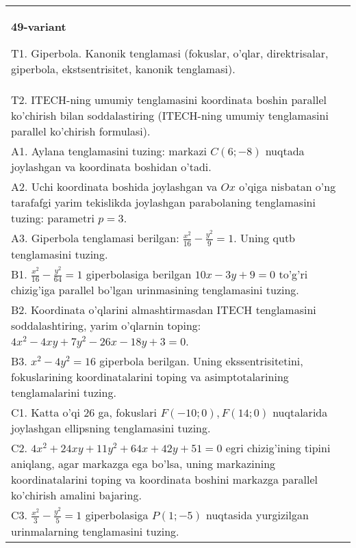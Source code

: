 \documentclass{article}
\begin{document}
\begin{tabular}{m{17cm}}
\textbf{49-variant}
\newline

T1. Giperbola. Kanonik tenglamasi (fokuslar, o'qlar, direktrisalar, giperbola, ekstsentrisitet, kanonik tenglamasi).\\

T2. ITECH-ning umumiy tenglamasini koordinata boshin parallel ko'chirish bilan soddalastiring (ITECH-ning umumiy tenglamasini parallel ko'chirish formulasi).\\

A1. Aylana tenglamasini tuzing: markazi $C(6;-8)$ nuqtada joylashgan va koordinata boshidan o'tadi.\\

A2. Uchi koordinata boshida joylashgan va $Ox$ o'qiga nisbatan o'ng tarafafgi yarim tekislikda joylashgan parabolaning tenglamasini tuzing: parametri $p=3$.\\

A3. Giperbola tenglamasi berilgan: $\frac{x^{2}}{16}-\frac{y^{2}}{9}=1$. Uning qutb tenglamasini tuzing.\\

B1. $\frac{x^{2}}{16} - \frac{y^{2}}{64} = 1$ giperbolasiga berilgan $10x - 3y + 9 = 0$ to'g'ri chizig'iga parallel bo'lgan urinmasining tenglamasini tuzing.  \\

B2. Koordinata o'qlarini almashtirmasdan ITECH tenglamasini soddalashtiring, yarim o'qlarnin toping: $4x^{2} - 4xy + 7y^{2} - 26x - 18y + 3 = 0$.\\

B3. $x^{2} - 4y^{2} = 16$ giperbola berilgan. Uning ekssentrisitetini, fokuslarining koordinatalarini toping va asimptotalarining tenglamalarini tuzing.\\

C1. Katta o'qi 26 ga, fokuslari $F( - 10;0), F(14;0)$ nuqtalarida joylashgan ellipsning tenglamasini tuzing.  \\

C2. $4x^{2} + 24xy + 11y^{2} + 64x + 42y + 51 = 0$ egri chizig'ining tipini aniqlang, agar markazga ega bo'lsa, uning markazining koordinatalarini toping va koordinata boshini markazga parallel ko'chirish amalini bajaring.\\

C3. $\frac{x^{2}}{3} - \frac{y^{2}}{5} = 1$ giperbolasiga $P(1; - 5)$ nuqtasida yurgizilgan urinmalarning tenglamasini tuzing.\\

\end{tabular}
\vspace{1cm}
\end{document}
